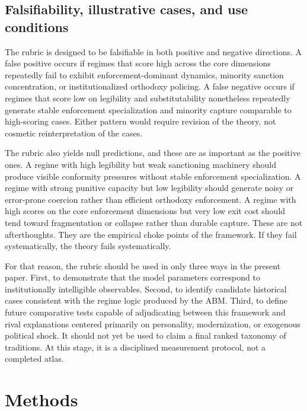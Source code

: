 \documentclass[12pt]{article}
\begin{document}
\subsection{Falsifiability, illustrative cases, and use conditions}

The rubric is designed to be falsifiable in both positive and negative directions. A false positive occurs if regimes that score high across the core dimensions repeatedly fail to exhibit enforcement-dominant dynamics, minority sanction concentration, or institutionalized orthodoxy policing. A false negative occurs if regimes that score low on legibility and substitutability nonetheless repeatedly generate stable enforcement specialization and minority capture comparable to high-scoring cases. Either pattern would require revision of the theory, not cosmetic reinterpretation of the cases.

The rubric also yields null predictions, and these are as important as the positive ones. A regime with high legibility but weak sanctioning machinery should produce visible conformity pressures without stable enforcement specialization. A regime with strong punitive capacity but low legibility should generate noisy or error-prone coercion rather than efficient orthodoxy enforcement. A regime with high scores on the core enforcement dimensions but very low exit cost should tend toward fragmentation or collapse rather than durable capture. These are not afterthoughts. They are the empirical choke points of the framework. If they fail systematically, the theory fails systematically.

For that reason, the rubric should be used in only three ways in the present paper. First, to demonstrate that the model parameters correspond to institutionally intelligible observables. Second, to identify candidate historical cases consistent with the regime logic produced by the ABM. Third, to define future comparative tests capable of adjudicating between this framework and rival explanations centered primarily on personality, modernization, or exogenous political shock. It should not yet be used to claim a final ranked taxonomy of traditions. At this stage, it is a disciplined measurement protocol, not a completed atlas.



\section{Methods}
\end{document}
